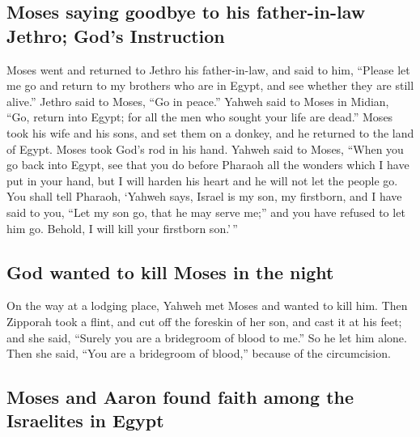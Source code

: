 \begin{paracol}{2}
\begin{otherlanguage}{english}
\hypertarget{moses-saying-goodbye-to-his-father-in-law-jethro-gods-instruction}{%
\subsection{Moses saying goodbye to his father-in-law Jethro; God's
Instruction}\label{moses-saying-goodbye-to-his-father-in-law-jethro-gods-instruction}}

 Moses went and returned to Jethro his father-in-law, and
said to him, ``Please let me go and return to my brothers who are in
Egypt, and see whether they are still alive.'' Jethro said to Moses,
``Go in peace.''  Yahweh said to Moses in Midian, ``Go,
return into Egypt; for all the men who sought your life are dead.''
 Moses took his wife and his sons, and set them on a
donkey, and he returned to the land of Egypt. Moses took God's rod in
his hand.  Yahweh said to Moses, ``When you go back into
Egypt, see that you do before Pharaoh all the wonders which I have put
in your hand, but I will harden his heart and he will not let the people
go.  You shall tell Pharaoh, `Yahweh says, Israel is my
son, my firstborn,  and I have said to you, ``Let my son
go, that he may serve me;'' and you have refused to let him go. Behold,
I will kill your firstborn son.'\,''

\hypertarget{god-wanted-to-kill-moses-in-the-night}{%
\subsection{God wanted to kill Moses in the
night}\label{god-wanted-to-kill-moses-in-the-night}}

 On the way at a lodging place, Yahweh met Moses and
wanted to kill him.  Then Zipporah took a flint, and cut
off the foreskin of her son, and cast it at his feet; and she said,
``Surely you are a bridegroom of blood to me.''  So he
let him alone. Then she said, ``You are a bridegroom of blood,'' because
of the circumcision.

\hypertarget{moses-and-aaron-found-faith-among-the-israelites-in-egypt}{%
\subsection{Moses and Aaron found faith among the Israelites in
Egypt}\label{moses-and-aaron-found-faith-among-the-israelites-in-egypt}}


\end{otherlanguage}
\end{paracol}
